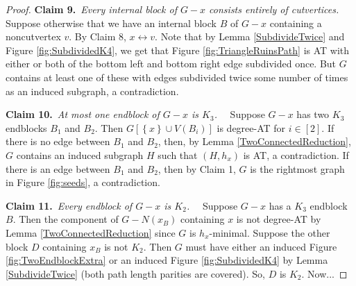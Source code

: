 \documentclass[12pt]{article}
\theoremstyle{plain}
\theoremstyle{definition}
\theoremstyle{remark}
\newcommand{\set}[1]{\left\{ #1 \right\}}
\newcommand{\irange}[1]{\left[#1\right]}
\def\adj{\leftrightarrow}
\newcommand{\claim}[2]{{\bf Claim #1.}~{\it #2}~~}
\def\adj{\leftrightarrow}
\begin{document}
\begin{proof}
	 \claim{9}{Every internal block of $G-x$ consists entirely of cutvertices.}
	 Suppose otherwise that we have an internal block $B$ of $G-x$ containing a noncutvertex $v$.  By Claim 8, $x \adj v$.  Note that by Lemma \ref{SubdivideTwice} and Figure \ref{fig:SubdividedK4}, we get that Figure \ref{fig:TriangleRuinsPath} is AT with either or both of the bottom left and bottom right edge subdivided once.  But $G$ contains at least one of these with edges subdivided twice some number of times as an induced subgraph, a contradiction.
	 
	 \claim{10}{At most one endblock of $G-x$ is $K_3$.}
	 Suppose $G-x$ has two $K_3$ endblocks $B_1$ and $B_2$.  Then $G[\set{x} \cup V(B_i)]$ is degree-AT for $i \in \irange{2}$.  If there is no edge between $B_1$ and $B_2$, then, by Lemma \ref{TwoConnectedReduction}, $G$ contains an induced subgraph $H$ such that $(H,h_x)$ is AT, a contradiction.  If there is an edge between $B_1$ and $B_2$, then by Claim 1, $G$ is the rightmost graph in Figure \ref{fig:seeds}, a contradiction.
	 

	 
	 \claim{11}{Every endblock of $G-x$ is $K_2$.}
	 Suppose $G-x$ has a $K_3$ endblock $B$.  Then the component of $G-N(x_B)$ containing $x$ is not degree-AT by Lemma \ref{TwoConnectedReduction} since $G$ is $h_x$-minimal.  Suppose the other block $D$ containing $x_B$ is not $K_2$. Then $G$ must have either an induced Figure \ref{fig:TwoEndblockExtra} or an induced Figure \ref{fig:SubdividedK4} by Lemma \ref{SubdivideTwice} (both path length parities are covered).  So, $D$ is $K_2$.  Now...

\end{proof}



\end{document}

